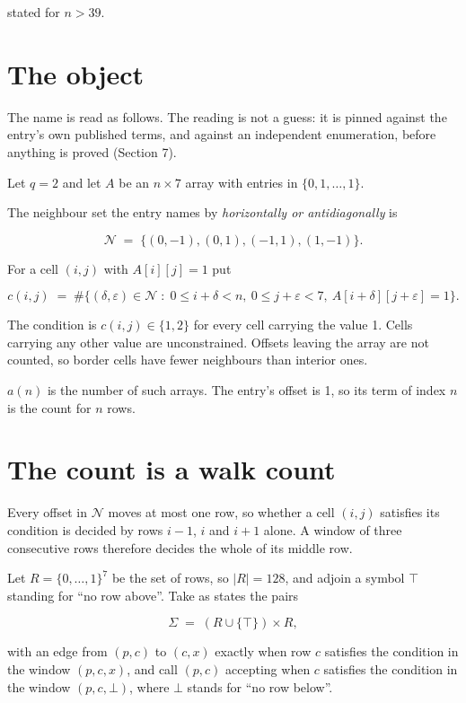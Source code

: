 \documentclass[11pt]{article}
\theoremstyle{definition}
\begin{document}
stated for $n > 39$.

\section{The object}

The name is read as follows. The reading is not a guess: it is pinned against the entry's own published terms, and against an independent enumeration, before anything is proved (Section 7).

Let $q = 2$ and let $A$ be an $n \times 7$ array with entries in $\{0,1,\dots,1\}$.

The neighbour set the entry names by {\itshape horizontally or antidiagonally} is

\[\mathcal{N} \;=\; \{(0,-1), (0,1), (-1,1), (1,-1)\}.\]

For a cell $(i,j)$ with $A[i][j] = 1$ put

\[c(i,j) \;=\; \#\bigl\{(\delta,\varepsilon)\in\mathcal{N} \;:\; 0\le i+\delta<n,\ 0\le j+\varepsilon<7,\ A[i+\delta][j+\varepsilon] = 1\bigr\}.\]

The condition is $c(i,j) \in \{1, 2\}$ for every cell carrying the value 1. Cells carrying any other value are unconstrained. Offsets leaving the array are not counted, so border cells have fewer neighbours than interior ones.

$a(n)$ is the number of such arrays. The entry's offset is 1, so its term of index $n$ is the count for $n$ rows.

\section{The count is a walk count}

Every offset in $\mathcal{N}$ moves at most one row, so whether a cell $(i,j)$ satisfies its condition is decided by rows $i-1$, $i$ and $i+1$ alone. A window of three consecutive rows therefore decides the whole of its middle row.

Let $R = \{0,\dots,1\}^{7}$ be the set of rows, so $|R| = 128$, and adjoin a symbol $\top$ standing for ``no row above''. Take as states the pairs

\[\Sigma \;=\; (R \cup \{\top\}) \times R,\]

with an edge from $(p,c)$ to $(c,x)$ exactly when row $c$ satisfies the condition in the window $(p,c,x)$, and call $(p,c)$ accepting when $c$ satisfies the condition in the window $(p,c,\bot)$, where $\bot$ stands for ``no row below''.
\end{document}
